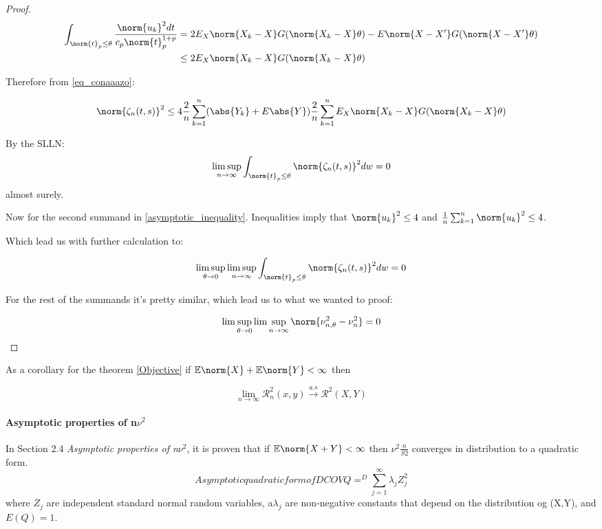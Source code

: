 \begin{proof}
\begin{equation}{}
\begin{split}
\int_{\norm{t}_{p}\leq\theta} \frac{\norm{u_{k}}^{2}dt}{c_{p}\norm{t}^{1+p}_{p}} &
= 2E_{X}\norm{X_{k}-X}G(\norm{X_{k}-X}\theta) - E\norm{X-X'}G(\norm{X-X'}\theta) \\
&\leq  2E_{X}\norm{X_{k}-X}G(\norm{X_{k}-X}\theta)
\end{split}
\end{equation}

Therefore from \ref{eq_conaaazo}:

$$
\norm{\zeta_{n}(t,s)}^{2} \leq 4\frac{2}{n}\sum_{k=1}^{n}(\abs{Y_{k}}+ E\abs{Y})\frac{2}{n}\sum_{k=1}^{n}E_{X}\norm{X_{k}-X}G(\norm{X_{k}-X}\theta)
$$

By the SLLN:
$$
\limsup_{n\rightarrow\infty}\int_{\norm{t}_{p}\leq\theta}\norm{\zeta_{n}(t,s)}^{2} dw = 0
$$
almost surely.

Now for the second summand in \ref{asymptotic_inequality}. Inequalities \label{eq_conaaazo} imply that $\norm{u_k}^{2} \leq 4$ and $\frac{1}{n}\sum_{k=1}^{n}\norm{u_k}^{2}\leq 4$. 

Which lead us with further calculation to:

$$
\limsup_{\theta\rightarrow0}\limsup_{n\rightarrow\infty}\int_{\norm{t}_{p}\leq\theta}\norm{\zeta_{n}(t,s)}^{2} dw = 0
$$

For the rest of the summands it's pretty similar, which lead us to what we wanted to proof:

$$
\lim\sup_{\theta \to 0} \lim\sup_{n \to \infty} \norm{\nu^{2}_{n,\theta}-\nu^{2}_{n}} = 0
$$
\end{proof}

\begin{prop}
As a corollary for the theorem \ref{Objective} 
if $\mathbb{E}\norm{X} + \mathbb{E}\norm{Y} < \infty$ then

$$
\lim_{n\to\infty} \mathcal{R}^{2}_{n}(x,y) \xrightarrow{a.s} \mathcal{R}^{2}(X,Y)
$$
\end{prop}

\paragraph{Asymptotic properties of n$\nu^{2}$}

In \cite{DCOV_1} Section 2.4 \textit{Asymptotic properties of n$\nu^{2}$}, it is proven that if $\mathbb{E}\norm{X+Y}< \infty$ then $\nu^{2}\frac{n}{S2}$ converges in distribution to a quadratic form.
\begin{equation}{Asymptotic quadratic form of DCOV}
Q =^{D}\sum_{j=1}^{\infty} \lambda_{j}Z_{j}^{2}
\end{equation}
where $Z_{j}$ are independent standard normal random variables, a$\lambda_{j}$ are non-negative constants that depend on the distribution og (X,Y), and $E(Q)=1$.

